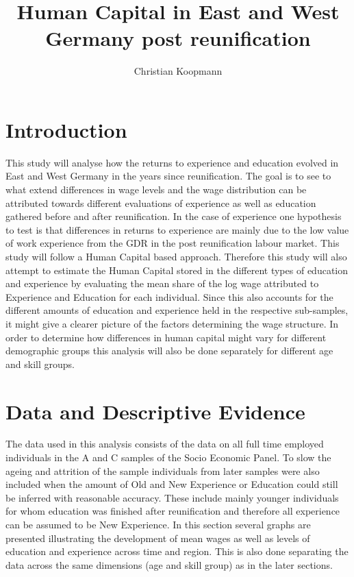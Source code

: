 \documentclass{article}
\begin{document}
\title{Human Capital in East and West Germany post reunification}
\author{Christian Koopmann}
\maketitle

\section{Introduction}
This study will analyse how the returns to experience and education evolved in East and West Germany in the years since reunification. The goal is to see to what extend differences in wage levels and the wage distribution can be attributed towards different evaluations of experience as well as education gathered before and after reunification. In the case of experience one hypothesis to test is that differences in returns to experience are mainly due to the low value of work experience from the GDR in the post reunification labour market. This study will follow a Human Capital based approach. Therefore this study will also attempt to estimate the Human Capital stored in the different types of education and experience by evaluating the mean share of the log wage attributed to Experience and Education for each individual. Since this also accounts for the different amounts of education and experience held in the respective sub-samples, it might give a clearer picture of the factors determining the wage structure. In order to determine how differences in human capital might vary for different demographic groups this analysis will also be done separately for different age and skill groups.

\section{Data and Descriptive Evidence}
The data used in this analysis consists of the data on all full time employed individuals in the A and C samples of the Socio Economic Panel. To slow the ageing and attrition of the sample individuals from later samples were also included when the amount of Old and New Experience or Education could still be inferred with reasonable accuracy. These include mainly younger individuals for whom education was finished after reunification and therefore all experience can be assumed to be New Experience. In this section several graphs are presented illustrating the development of mean wages as well as levels of education and experience across time and region. This is also done separating the data across the same dimensions (age and skill group) as in the later sections.
\end{document}

